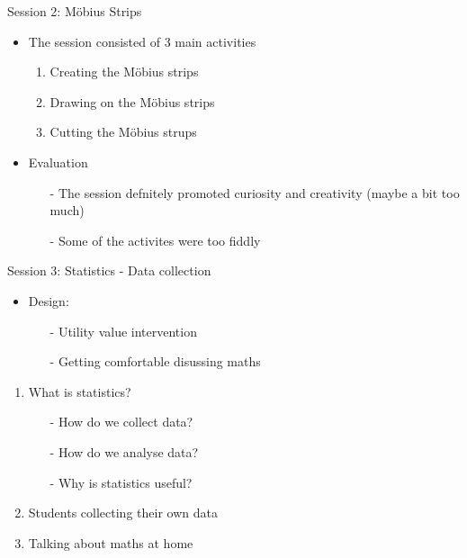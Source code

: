 \documentclass{beamer}  %
\begin{document}
\begin{frame}{Session 2: M\"{o}bius Strips}
    \begin{itemize}
        \item The session consisted of 3 main activities
        \begin{enumerate}
            \item Creating the M\"{o}bius strips
            \item Drawing on the M\"{o}bius strips
            \item Cutting the  M\"{o}bius strups
        \end{enumerate}

        \vspace{10pt}

        \item Evaluation
        \begin{itemize}
            \item[-] The session defnitely promoted curiosity and creativity  (maybe a bit too much)
            \item[-] Some of the activites were too fiddly 
        \end{itemize}
    \end{itemize}
\end{frame}
\begin{frame}{Session 3: Statistics - Data collection}
        \begin{itemize}
            \item Design:
            \begin{itemize}
                \item[-] Utility value intervention
                \item[-] Getting comfortable disussing maths
            \end{itemize}
        \end{itemize}
        \begin{enumerate}
            \item What is statistics?
            \begin{itemize}
                \item[-] How do we collect data?
                \item[-] How do we analyse data?
                \item[-] Why is statistics useful?
            \end{itemize}
            \item Students collecting their own data         
            \item Talking about maths at home
        \end{enumerate}
\end{frame}
\end{document}
